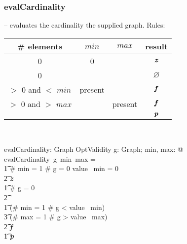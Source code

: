 \documentclass[fuzz]{llncs}
\def\pass{\textbf{\textit{p}}}
\def\fail{\textbf{\textit{f}}}
\def\dunno{\varnothing}
\def\nomatch{\textbf{\textit{z}}}
\begin{document}
\subsubsection{evalCardinality} -- evaluates the cardinality the supplied graph. Rules:


\begin{tabular}{| c || c | c || c |}
   \hline 
   \# elements & $min$ & $max$ & result \\
   \hline \hline
   0 & 0 & & $\nomatch$ \\ \hline
   0 &  & & $\dunno$ \\ \hline
   $>$ 0 and $<$ $min$ & present &  & $\fail$ \\ \hline
   $>$ 0 and $>$ $max$ & & present & $\fail$ \\ \hline
    & & & $\pass$ \\ \hline
\end{tabular} \\


\begin{gendef}
   evalCardinality: Graph \fun \optional[\nat] \fun \optional[\nat] \fun OptValidity
\where
   \forall g: Graph; min, max: \optional[\nat] @ evalCardinality~g~min~max = \\
   \t1 \IF \# min = 1 \land \# g = 0 \land  value~ min = 0 \\
\t2 \THEN \nomatch \\
\t1 \ELSE \IF \# g = 0 \\
\t2 \THEN \dunno \\
\t1 \ELSE \IF (\# min = 1 \land \# g < value~ min) \lor \\
\t3 (\# max = 1 \land \# g > value~ max) \\
\t2 \THEN \fail \\
\t1 \ELSE \pass
\end{gendef}
\end{document}
